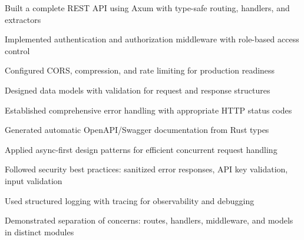 \begin{chaptersummary}
\item Built a complete REST API using Axum with type-safe routing, handlers, and extractors
\item Implemented authentication and authorization middleware with role-based access control
\item Configured CORS, compression, and rate limiting for production readiness
\item Designed data models with validation for request and response structures
\item Established comprehensive error handling with appropriate HTTP status codes
\item Generated automatic OpenAPI/Swagger documentation from Rust types
\item Applied async-first design patterns for efficient concurrent request handling
\item Followed security best practices: sanitized error responses, API key validation, input validation
\item Used structured logging with tracing for observability and debugging
\item Demonstrated separation of concerns: routes, handlers, middleware, and models in distinct modules
\end{chaptersummary}

